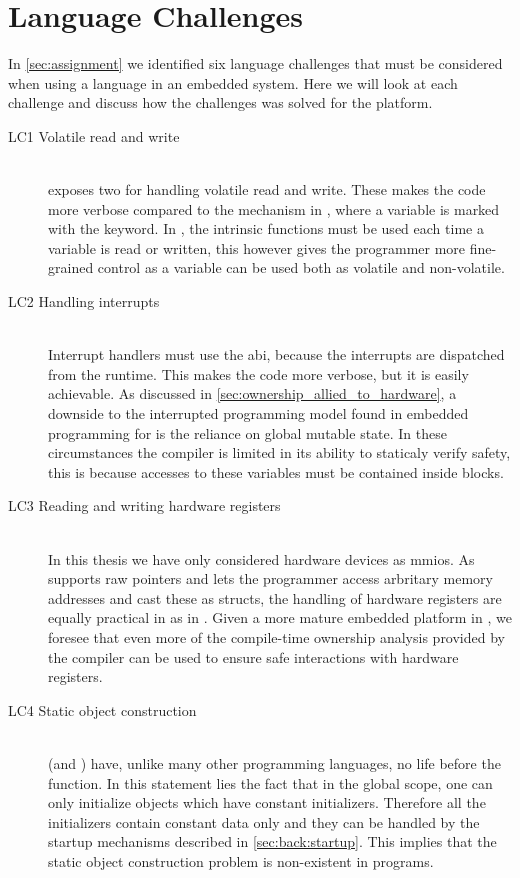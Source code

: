 \section{Language Challenges}
\label{sec:disc:lang-challenges}

In \autoref{sec:assignment} we identified six language challenges that must be considered when using a language in an embedded system.
Here we will look at each challenge and discuss how the challenges was solved for the {\rg} platform.

\begin{description}
\item [LC1 Volatile read and write] \hfill \\
  {\rust} exposes two  for handling volatile read and write.
  These makes the code more verbose compared to the mechanism in {\C}, where a variable is marked with the  keyword.
  In {\rust}, the intrinsic functions must be used each time a variable is read or written, this however gives the programmer more fine-grained control as a variable can be used both as volatile and non-volatile.

\item [LC2 Handling interrupts] \hfill \\
  Interrupt handlers must use the {\C} \gls{abi}, because the interrupts are dispatched from the {\C} runtime.
  This makes the code more verbose, but it is easily achievable.
  As discussed in \autoref{sec:ownership_allied_to_hardware}, a downside to the interrupted programming model found in embedded programming for {\rust} is the reliance on global mutable state.
  In these circumstances the compiler is limited in its ability to staticaly verify safety, this is because accesses to these variables must be contained inside {\unsafe} blocks.

\item [LC3 Reading and writing hardware registers] \hfill \\
  In this thesis we have only considered hardware devices as \glspl{mmio}.
  As {\rust} supports raw pointers and lets the programmer access arbritary memory addresses and cast these as structs, the handling of hardware registers are equally practical in {\rust} as in {\C}.
  Given a more mature embedded platform in {\rust}, we foresee that even more of the compile-time ownership analysis provided by the {\rust} compiler can be used to ensure safe interactions with hardware registers.

\item [LC4 Static object construction] \hfill \\
  {\rust} (and {\C}) have, unlike many other programming languages, no life before the {\main} function.
  In this statement lies the fact that in the global scope, one can only initialize objects which have constant initializers.
  Therefore all the initializers contain constant data only and they can be handled by the startup mechanisms described in \autoref{sec:back:startup}.
  This implies that the static object construction problem is non-existent in {\rust} programs.


\end{description}
